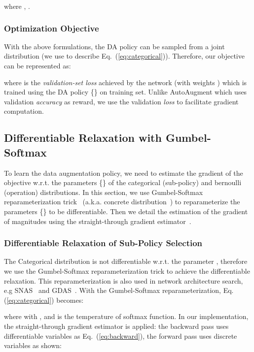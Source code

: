 \documentclass[runningheads]{llncs}
\begin{document}
where ,
.


\subsubsection{Optimization Objective}
With the above formulations, the DA policy can be sampled from a joint distribution  (we use  to describe Eq.~(\ref{eq:categorical})). Therefore, our objective can be represented as:

where  is the \emph{validation-set loss} achieved by the network (with weights ) which is trained using the DA policy \{\} on training set. Unlike AutoAugment which uses validation \emph{accuracy} as reward, we use the validation \emph{loss} to facilitate gradient computation.



\subsection{Differentiable Relaxation with Gumbel-Softmax}
\label{subsec:gumbel}
{To learn the data augmentation policy, we need to estimate the gradient of the objective w.r.t. the parameters  \{\} of the categorical (sub-policy) and bernoulli (operation) distributions.
In this section, we use Gumbel-Softmax reparameterization trick~\cite{DBLP:conf/iclr/JangGP17} (a.k.a. concrete distribution~\cite{DBLP:conf/iclr/MaddisonMT17}) to reparameterize the parameters \{\} to be differentiable. Then we detail the estimation of
the gradient of magnitudes  using the straight-through gradient estimator~\cite{DBLP:journals/corr/BengioLC13}.}

\subsubsection{Differentiable Relaxation of Sub-Policy Selection}
The Categorical distribution is not differentiable w.r.t. the parameter , therefore we use the Gumbel-Softmax reparameterization trick to achieve the differentiable relaxation. This reparameterization is also used in network architecture search, e.g  SNAS~\cite{DBLP:conf/iclr/XieZLL19} and GDAS~\cite{Dong_2019_CVPR}. 
With the Gumbel-Softmax reparameterization, Eq. (\ref{eq:categorical}) becomes:

where  with , and  is the temperature of softmax function.
In our implementation, the straight-through gradient estimator is applied: the backward pass uses differentiable variables as Eq.~(\ref{eq:backward}), the forward pass uses  discrete variables as shown:
\end{document}
